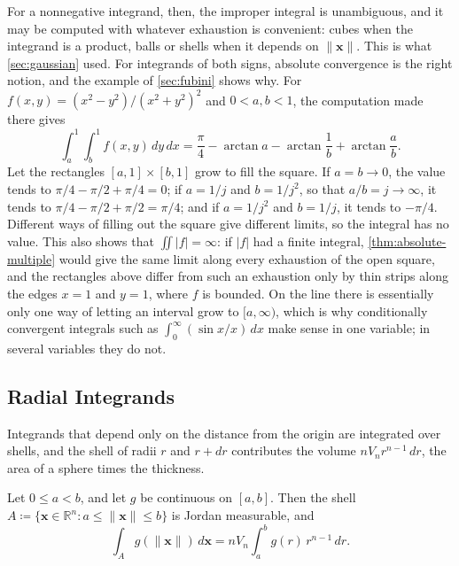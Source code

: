 For a nonnegative integrand, then, the improper integral is unambiguous, and it may be computed with whatever exhaustion is convenient: cubes when the integrand is a product, balls or shells when it depends on $\|\mathbf x\|$. This is what \cref{sec:gaussian} used. For integrands of both signs, absolute convergence is the right notion, and the example of \cref{sec:fubini} shows why. For $f(x,y)=(x^2-y^2)/(x^2+y^2)^2$ and $0<a,b<1$, the computation made there gives
\[
\int_a^1\int_b^1f(x,y)\,dy\,dx=\frac\pi4-\arctan a-\arctan\frac1b+\arctan\frac ab .
\]
Let the rectangles $[a,1]\times[b,1]$ grow to fill the square. If $a=b\to0$, the value tends to $\pi/4-\pi/2+\pi/4=0$; if $a=1/j$ and $b=1/j^2$, so that $a/b=j\to\infty$, it tends to $\pi/4-\pi/2+\pi/2=\pi/4$; and if $a=1/j^2$ and $b=1/j$, it tends to $-\pi/4$. Different ways of filling out the square give different limits, so the integral has no value. This also shows that $\iint|f|=\infty$: if $|f|$ had a finite integral, \cref{thm:absolute-multiple} would give the same limit along every exhaustion of the open square, and the rectangles above differ from such an exhaustion only by thin strips along the edges $x=1$ and $y=1$, where $f$ is bounded. On the line there is essentially only one way of letting an interval grow to $[a,\infty)$, which is why conditionally convergent integrals such as $\int_0^\infty(\sin x/x)\,dx$ make sense in one variable; in several variables they do not.

\subsection{Radial Integrands}

Integrands that depend only on the distance from the origin are integrated over shells, and the shell of radii $r$ and $r+dr$ contributes the volume $nV_nr^{n-1}\,dr$, the area of a sphere times the thickness.

\begin{proposition}
\label{prop:radial}
Let $0\le a<b$, and let $g$ be continuous on $[a,b]$. Then the shell $A\coloneqq\{\mathbf x\in\mathbb R^n: a\le\|\mathbf x\|\le b\}$ is Jordan measurable, and
\[
\int_Ag(\|\mathbf x\|)\,d\mathbf x=nV_n\int_a^bg(r)\,r^{n-1}\,dr .
\]
\end{proposition}

